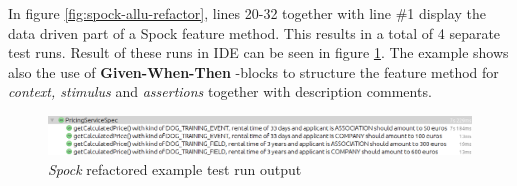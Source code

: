     \restoregeometry
    In figure \ref{fig:spock-allu-refactor}, lines 20-32 together with line \#1 display the data driven part of a Spock
    feature method. This results in a total of
    4 separate test runs. Result of these runs in IDE can be seen in figure \ref{fig:spock-allu-refactor-output}. The
    example shows also the use of \textbf{Given-When-Then} -blocks to structure the feature method for \textit{context, stimulus}
    and \textit{assertions} together with description comments.

    \begin{figure}[H]
      \begin{center}
        \begin{topbot}[style=mdstyle]
        \includegraphics[width=\textwidth]{images/spock-pricing-results.png}
        \end{topbot}
        \caption{\textit{Spock} refactored example test run output}
        \label{fig:spock-allu-refactor-output}
      \end{center}
    \end{figure}

